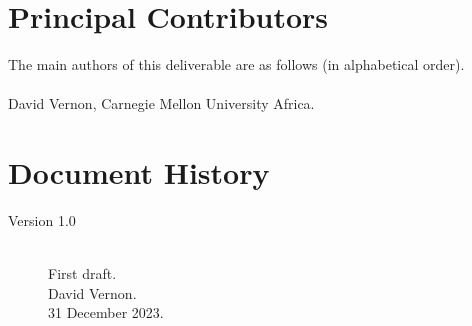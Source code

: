 \documentclass{CSSRforAfrica}
\newcommand{\blank}{~\\}
\begin{document}
%



\pagebreak
\section*{Principal Contributors}
\label{contributors}
The main authors of this deliverable are as follows (in alphabetical order).
\blank
~
\blank
David Vernon, Carnegie Mellon University Africa.\\   
  

\newpage
\section*{Document History}
\label{document_history}

\begin{description}

\item [Version 1.0]~\\
First draft. \\
David Vernon. \\                          
31 December 2023.

\end{description}
\end{document}

